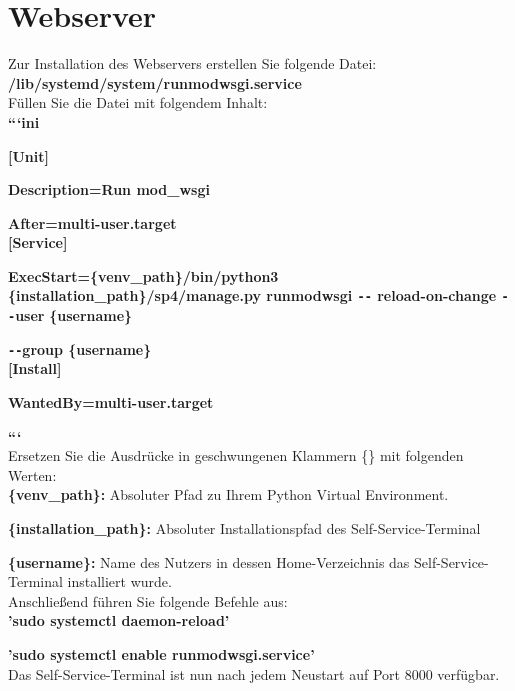 \section{Webserver}
Zur Installation des Webservers erstellen Sie folgende Datei:\\

\textbf{/lib/systemd/system/runmodwsgi.service}\\

\noindent Füllen Sie die Datei mit folgendem Inhalt:\\

\textbf{```ini}\par
\textbf{[Unit]}\par
\textbf{Description=Run mod\_wsgi}\par
\textbf{After=multi-user.target}\\

\textbf{[Service]}\par
\textbf{ExecStart=\{venv\_path\}/bin/python3 \{installation\_path\}/sp4/manage.py \indent runmodwsgi \texttt{-{}-}
reload-on-change \texttt{-{}-}user} \textbf{\{username\}}\par\textbf{\texttt{-{}-}group \{username\}}\\


\textbf{[Install]}\par
\textbf{WantedBy=multi-user.target}\par
\textbf{```}\\

\noindent Ersetzen Sie die Ausdrücke in geschwungenen Klammern \{\} mit folgenden Werten:\\
\noindent \textbf{\{venv\_path\}:} Absoluter Pfad zu Ihrem Python Virtual Environment.\par
\noindent \textbf{\{installation\_path\}:} Absoluter Installationspfad des Self-Service-Terminal\par
\noindent \textbf{\{username\}:} Name des Nutzers in dessen Home-Verzeichnis das Self-Service-Terminal installiert wurde.\\

\noindent Anschließend führen Sie folgende Befehle aus:\\

\textbf{’sudo systemctl daemon-reload’}\par
\textbf{’sudo systemctl enable runmodwsgi.service’}\\

\noindent Das Self-Service-Terminal ist nun nach jedem Neustart auf Port 8000 verfügbar.